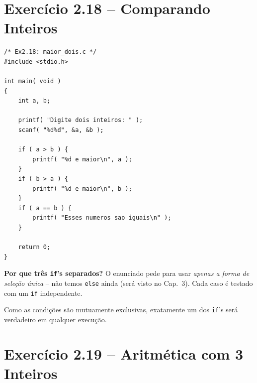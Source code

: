 \documentclass[12pt,a4paper]{article}
\begin{document}
\section{Exercício 2.18 -- Comparando Inteiros}

\begin{respostabox}
\begin{lstlisting}
/* Ex2.18: maior_dois.c */
#include <stdio.h>

int main( void )
{
    int a, b;

    printf( "Digite dois inteiros: " );
    scanf( "%d%d", &a, &b );

    if ( a > b ) {
        printf( "%d e maior\n", a );
    }
    if ( b > a ) {
        printf( "%d e maior\n", b );
    }
    if ( a == b ) {
        printf( "Esses numeros sao iguais\n" );
    }

    return 0;
}
\end{lstlisting}

\textbf{Por que três \texttt{if}'s separados?} O enunciado pede para usar
\textit{apenas a forma de seleção única} -- não temos \texttt{else} ainda
(será visto no Cap.~3). Cada caso é testado com um \texttt{if} independente.

Como as condições são mutuamente exclusivas, exatamente um dos \texttt{if}'s
será verdadeiro em qualquer execução.
\end{respostabox}

\newpage

\section{Exercício 2.19 -- Aritmética com 3 Inteiros}
\end{document}
